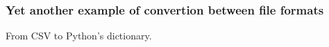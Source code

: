 \begin{frame}[fragile]
  \frametitle{Yet another example of convertion between file formats}
  From CSV to Python's dictionary.
\end{frame}
